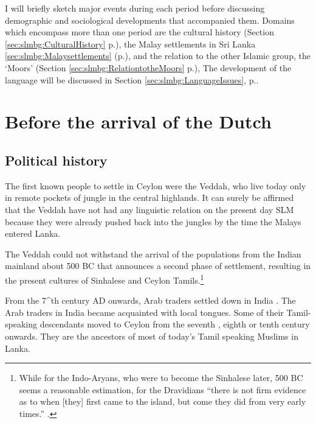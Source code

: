 I will briefly sketch major events during each period before discussing demographic and sociological developments that accompanied them. Domains which encompass more than one period are
the cultural history (Section \ref{sec:slmbg:CulturalHistory} p.\pageref{sec:slmbg:CulturalHistory}),
the Malay settlements in Sri Lanka \ref{sec:slmbg:Malaysettlements} (p.\pageref{sec:slmbg:Malaysettlements}),
and the relation to the other Islamic group, the `Moors' (Section \ref{sec:slmbg:RelationtotheMoors}  p.\pageref{sec:slmbg:RelationtotheMoors}),
The development of the language will be discussed in Section \ref{sec:slmbg:LanguageIssues}, p.\pageref{sec:slmbg:LanguageIssues}.

\section{Before the arrival of the Dutch}\label{sec:slmbg:HistorybeforethearrivaloftheDutch} 

\subsection{Political history}\label{sec:slmbg:preDutch:Political history} 
The first known people to settle in Ceylon were the Veddah, who
live today only in remote pockets of jungle in the central
highlands.
It can surely be affirmed that the Veddah have not had any
linguistic relation on the present day SLM because they were
already pushed back into the jungles by the time the Malays entered
Lanka.

The Veddah could not withstand the arrival of the populations from the Indian mainland about 500 BC \citep[1]{GairEtAl1997} that announces a second phase of settlement, resulting in the present cultures of Sinhalese and Ceylon Tamils.\footnote{While for the Indo-Aryans, who were to become the Sinhalese later, 500 BC seems a reasonable estimation, for the Dravidians ``there is not firm evidence as to when [they] first came to the island, but come they did from very early times.'' \citep[12]{Desilva1981}.}

From the 7^{th} century AD onwards, Arab traders settled down in  India \citep[51]{Codrington1926}. The Arab traders in India became acquainted with local tongues. Some of their Tamil-speaking descendants moved to Ceylon from the seventh \citep[32]{Nuhman2007}, eighth \citep[21]{Hussein2007} or tenth \citep[72]{Desilva1981} century onwards. They are the ancestors of most of today's Tamil speaking Muslims in Lanka.

